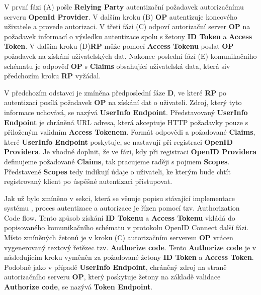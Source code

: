 \documentclass[
  printed, %
  twoside, %
  table,   %
  nolof,     %
  nolot,     %
]{fithesis3}
\begin{document}
V první fázi (A) pošle \textbf{Relying Party} autentizační požadavek autorizačnímu serveru \textbf{OpenId Provider}. V dalším kroku (B) \textbf{OP} autentizuje koncového uživatele a provede autorizaci. V třetí fázi (C) odpoví autorizační server \textbf{OP} na požadavek informací o výsledku autentizace spolu s žetony \textbf{ID Token} a \textbf{Access Token}. V dalším kroku (D)\break \textbf{RP} může pomocí \textbf{Access Tokenu} poslat \textbf{OP} požadavek na získání uživatelských dat. Nakonec poslední fází (E) komunikačního schématu je odpověď \textbf{OP} s \textbf{Claims} obsahující uživatelská data, která si\break v předchozím kroku \textbf{RP} vyžádal. 
\par

V předchozím odstavci je zmíněna předposlední fáze \textbf{D}, ve které \textbf{RP} po autentizaci posílá požadavek \textbf{OP} na získání dat o uživateli. Zdroj, který tyto informace uchovává, se nazývá \textbf{UserInfo Endpoint}. Představovaný \textbf{UserInfo Endpoint} je chráněná URL adresa, která akceptuje HTTP požadavky pouze s přiloženým validním \textbf{Access Tokenem}. Formát odpovědi a požadované \textbf{Claims}, které \textbf{UserInfo Endpoint} poskytuje, se nastavují při registraci \textbf{OpenID Providera}. Je vhodné doplnit, že ve fázi, kdy při registraci \textbf{OpenID Providera} definujeme požadované \textbf{Claims}, tak pracujeme raději s pojmem \textbf{Scopes}. Představené \textbf{Scopes} tedy indikují údaje o uživateli, ke kterým bude chtít registrovaný klient po úspěšné autentizaci přistupovat.
\par

Jak už bylo zmíněno v sekci, která se věnuje popisu stávající implementace systému , proces autentizace a autorizace je řízen pomocí tzv. Authorization Code flow. Tento způsob získání \textbf{ID Tokenu} a \textbf{Access Tokenu} vkládá do popisovaného komunikačního schématu v protokolu OpenID Connect další fázi. Místo zmíněných žetonů je v kroku (C) autorizačním serverem \textbf{OP} vrácen vygenerovaný textový řetězec tzv. \textbf{Authorize code}. Tento \textbf{Authorize code} je v následujícím kroku vyměněn za požadované žetony \textbf{ID Token} a \textbf{Access Token}. Podobně jako v případě \textbf{UserInfo Endpoint}, chráněný zdroj na straně autorizačního serveru \textbf{OP}, který poskytuje žetony na základě validace \textbf{Authorize code}, se nazývá \textbf{Token Endpoint}.
\end{document}
